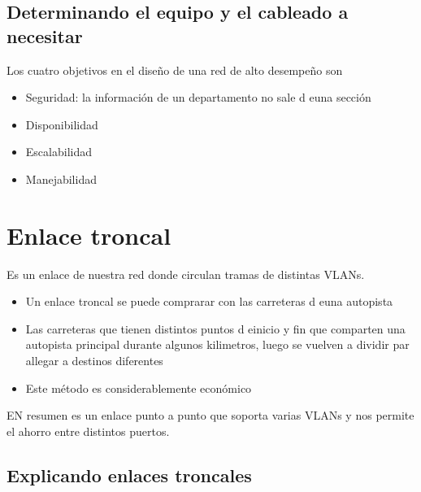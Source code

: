\subsection{Determinando el equipo y el cableado a necesitar}
Los cuatro objetivos en el diseño de una red de alto desempeño son
\begin{itemize}
    \item Seguridad: la información de un departamento no sale d euna sección 
    \item Disponibilidad 
    \item Escalabilidad 
    \item Manejabilidad
\end{itemize}

\section{Enlace troncal}
Es un enlace de nuestra red donde circulan tramas de distintas VLANs.

\begin{itemize}
    \item {Un enlace troncal se puede comprarar con las carreteras d euna autopista}
    \item {Las carreteras que tienen distintos puntos d einicio y fin que comparten una autopista principal durante algunos kilimetros, luego se vuelven a dividir par allegar a destinos diferentes}
    \item {Este método es considerablemente económico}
\end{itemize}

EN resumen es un enlace punto a punto que soporta varias VLANs y nos permite el ahorro entre distintos puertos.

\subsection{Explicando enlaces troncales}


